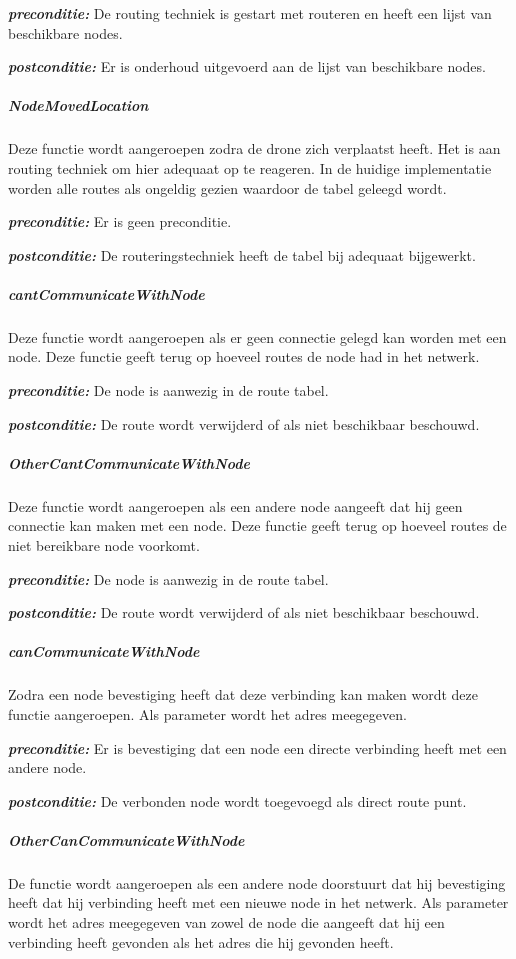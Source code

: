 \documentclass[a4paper, 11pt, oneside]{report}
\begin{document}
\textbf{\textit{preconditie:}} De routing techniek is gestart met routeren en heeft een lijst van beschikbare nodes.

\textbf{\textit{postconditie:}} Er is onderhoud uitgevoerd aan de lijst van beschikbare nodes.

\subparagraph{NodeMovedLocation} 
Deze functie wordt aangeroepen zodra de drone zich verplaatst heeft. Het is aan routing techniek om hier adequaat op te reageren.
In de huidige implementatie worden alle routes als ongeldig gezien waardoor de tabel geleegd wordt. 

\textbf{\textit{preconditie:}} Er is geen preconditie.

\textbf{\textit{postconditie:}} De routeringstechniek heeft de tabel bij adequaat bijgewerkt.


\subparagraph{cantCommunicateWithNode} 
Deze functie wordt aangeroepen als er geen connectie gelegd kan worden met een node. Deze functie geeft terug op hoeveel routes de node had in het netwerk. 

\textbf{\textit{preconditie:}} De node is aanwezig in de route tabel.

\textbf{\textit{postconditie:}} De route wordt verwijderd of als niet beschikbaar beschouwd.


\subparagraph{OtherCantCommunicateWithNode}
Deze functie wordt aangeroepen als een andere node aangeeft dat hij geen connectie kan maken met een node. Deze functie geeft terug op hoeveel routes de niet bereikbare node voorkomt. 

\textbf{\textit{preconditie:}} De node is aanwezig in de route tabel.

\textbf{\textit{postconditie:}} De route wordt verwijderd of als niet beschikbaar beschouwd.

\subparagraph{canCommunicateWithNode}
Zodra een node bevestiging heeft dat deze verbinding kan maken wordt deze functie aangeroepen. Als parameter wordt het adres meegegeven.

\textbf{\textit{preconditie:}} Er is bevestiging dat een node een directe verbinding heeft met een andere node.

\textbf{\textit{postconditie:}} De verbonden node wordt toegevoegd als direct route punt.
 
\subparagraph{OtherCanCommunicateWithNode}
De functie wordt aangeroepen als een andere node doorstuurt dat hij bevestiging heeft dat hij verbinding heeft met een nieuwe node in het netwerk. Als parameter wordt het adres meegegeven van zowel de node die aangeeft dat hij een verbinding heeft gevonden als het adres die hij gevonden heeft.
\end{document}
